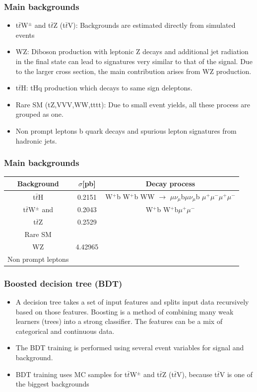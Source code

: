 \documentclass[11pt]{beamer}
\begin{document}
\begin{frame}
\frametitle{Main backgrounds}
\begin{itemize}
\item t$\bar{t}$W$^\pm$ and t$\bar{t}$Z (t$\bar{t}$V): Backgrounds are estimated directly from simulated events%
	\item WZ: Diboson production with leptonic Z decays and additional jet radiation in the final state can
	lead to signatures very similar to that of the signal. Due to the larger cross section, the main
	contribution arises from WZ production.
	\item t$\bar{t}$H: tHq production which decays to same sign deleptons.
\item Rare SM (tZ,VVV,WW,tttt): Due to small event yields, all these process are grouped as one.
\item Non prompt leptons b quark decays and spurious lepton signatures from hadronic jets.
\end{itemize}
\end{frame}

\begin{frame}
\frametitle{Main backgrounds}
\begin{tabular}{|c|c|c|}
	Background & $\sigma$[pb] & Decay process \\
	\hline
t$\bar{t}$H	& 0.2151 & W$^+$b W$^+$b WW $\rightarrow$ $\mu \nu_\mu$b$\mu \nu_\mu$b $\mu^+\mu^-$$\mu^+\mu^-$\\
\hline  
t$\bar{t}$W$^\pm$ and &0.2043 &  W$^+$b W$^+$b$\mu^+\mu^-$\\
\hline
 t$\bar{t}$Z & 0.2529 & \\
 \hline 
  Rare SM  & & \\
  \hline 
 WZ &4.42965 & \\
 \hline
 Non prompt leptons & & \\
\end{tabular}
\end{frame}

\begin{frame}
\frametitle{Boosted decision tree (BDT)}
\begin{itemize}
\item A decision tree takes a set of input features and splits input data recursively based on
those features.
Boosting is a method of combining many weak learners (trees) into a strong classifier. The features can be a mix of categorical and continuous data.
\item The BDT training is performed using several event variables for signal and background. 
	\item BDT training uses MC samples for  t$\bar{t}$W$^\pm$ and t$\bar{t}$Z (t$\bar{t}$V),
	because t$\bar{t}$V is one of the biggest backgrounds
\end{itemize}
\end{frame}
\end{document}
